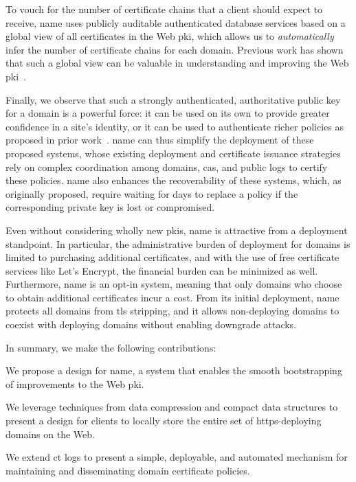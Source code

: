 To vouch for the number of certificate chains that a client should expect to
receive, \ac{name} uses publicly auditable authenticated database services based
on a global view of all certificates in the Web \ac{pki}, which allows us to
\emph{automatically} infer the number of certificate chains for each domain.
Previous work has shown that such a global view can be valuable in understanding
and improving the Web \ac{pki}~\cite{durumeric2015search, larisch2017crlite}.

Finally, we observe that such a strongly authenticated, authoritative public key
for a domain is a powerful force: it can be used on its own to provide greater
confidence in a site's identity, or it can be used to authenticate richer
policies as proposed in prior work~\cite{basin2014arpki,
szalachowski2014policert}. \ac{name} can thus simplify the deployment of these
proposed systems, whose existing deployment and certificate issuance strategies
rely on complex coordination among domains, \acp{ca}, and public logs to certify
these policies. \ac{name} also enhances the recoverability of these systems,
which, as originally proposed, require waiting for days to replace a policy if
the corresponding private key is lost or compromised.

Even without considering wholly new \acp{pki}, \ac{name} is attractive from a
deployment standpoint. In particular, the administrative burden of deployment
for domains is limited to purchasing additional certificates, and with the use
of free certificate services like Let's
Encrypt, the financial burden can be
minimized as well. Furthermore, \ac{name} is an opt-in system, meaning that only
domains who choose to obtain additional certificates incur a cost. From its
initial deployment, \ac{name} protects all domains from \ac{tls} stripping, and
it allows non-deploying domains to coexist with deploying domains without
enabling downgrade attacks.

In summary, we make the following contributions:
\begin{compactitem}
\item We propose a design for \ac{name}, a system that enables the smooth
  bootstrapping of improvements to the Web \ac{pki}.
\item We leverage techniques from data compression and compact data structures
  to present a design for clients to locally store the entire set of
  \ac{https}-deploying domains on the Web.
\item We extend \ac{ct} logs to present a simple, deployable, and automated
  mechanism for maintaining and disseminating domain certificate policies.
\end{compactitem}


